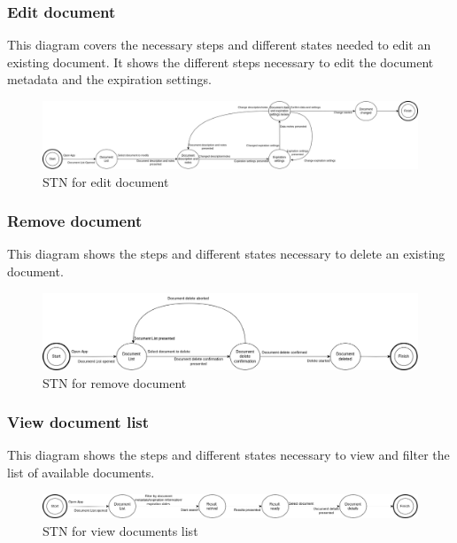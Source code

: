\subsubsection{Edit document}
This diagram covers the necessary steps and different states needed to edit an existing document. It shows the different steps necessary to edit the document metadata and the expiration settings.
\begin{figure}[H]
	\centering
	\includegraphics[width=\textwidth]{../Draw.io diagrams/document_edit_STN.drawio.png}  %
	\caption{STN for edit document}
\end{figure}
\subsubsection{Remove document}
This diagram shows the steps and different states necessary to delete an existing document.
\begin{figure}[H]
	\centering
	\includegraphics[width=\textwidth]{../Draw.io diagrams/document_delete_STN.drawio.png}  %
	\caption{STN for remove document}
\end{figure}
\subsubsection{View document list}
This diagram shows the steps and different states necessary to view and filter the list of available documents.
\begin{figure}[H]
	\centering
	\includegraphics[width=\textwidth]{../Draw.io diagrams/document_search_STN.drawio.png}  %
	\caption{STN for view documents list}
\end{figure}
